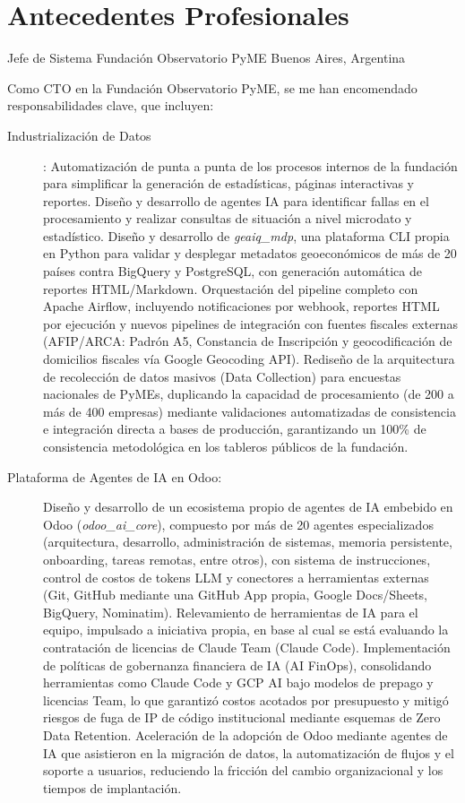 \section{Antecedentes Profesionales}

	{Jefe de Sistema}
	{Fundación Observatorio PyME}
	{Buenos Aires, Argentina}
	{}
	{Como CTO en la Fundación Observatorio PyME, se me han encomendado responsabilidades clave, que incluyen:
	\begin{description}
		\item[Industrialización de Datos]: Automatización de punta a punta de los procesos internos de la fundación para simplificar la generación de estadísticas, páginas interactivas y reportes. Diseño y desarrollo de agentes IA para identificar fallas en el procesamiento y realizar consultas de situación a nivel microdato y estadístico. Diseño y desarrollo de \emph{geaiq\_mdp}, una plataforma CLI propia en Python para validar y desplegar metadatos geoeconómicos de más de 20 países contra BigQuery y PostgreSQL, con generación automática de reportes HTML/Markdown. Orquestación del pipeline completo con Apache Airflow, incluyendo notificaciones por webhook, reportes HTML por ejecución y nuevos pipelines de integración con fuentes fiscales externas (AFIP/ARCA: Padrón A5, Constancia de Inscripción y geocodificación de domicilios fiscales vía Google Geocoding API). Rediseño de la arquitectura de recolección de datos masivos (Data Collection) para encuestas nacionales de PyMEs, duplicando la capacidad de procesamiento (de 200 a más de 400 empresas) mediante validaciones automatizadas de consistencia e integración directa a bases de producción, garantizando un 100\% de consistencia metodológica en los tableros públicos de la fundación.
			\item[Plataforma de Agentes de IA en Odoo:] Diseño y desarrollo de un ecosistema propio de agentes de IA embebido en Odoo (\emph{odoo\_ai\_core}), compuesto por más de 20 agentes especializados (arquitectura, desarrollo, administración de sistemas, memoria persistente, onboarding, tareas remotas, entre otros), con sistema de instrucciones, control de costos de tokens LLM y conectores a herramientas externas (Git, GitHub mediante una GitHub App propia, Google Docs/Sheets, BigQuery, Nominatim). Relevamiento de herramientas de IA para el equipo, impulsado a iniciativa propia, en base al cual se está evaluando la contratación de licencias de Claude Team (Claude Code). Implementación de políticas de gobernanza financiera de IA (AI FinOps), consolidando herramientas como Claude Code y GCP AI bajo modelos de prepago y licencias Team, lo que garantizó costos acotados por presupuesto y mitigó riesgos de fuga de IP de código institucional mediante esquemas de Zero Data Retention. Aceleración de la adopción de Odoo mediante agentes de IA que asistieron en la migración de datos, la automatización de flujos y el soporte a usuarios, reduciendo la fricción del cambio organizacional y los tiempos de implantación.

\end{description}}
